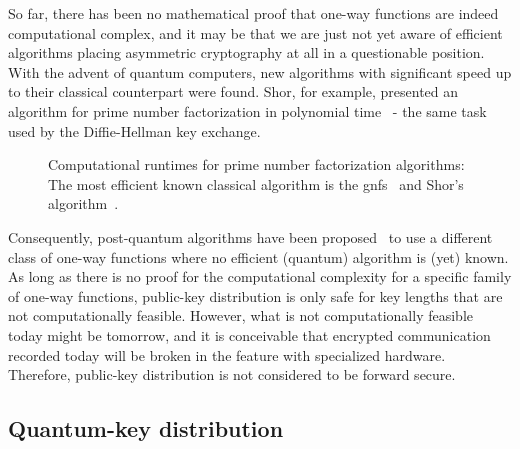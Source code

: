 So far, there has been no mathematical proof that one-way functions are indeed computational complex, and it may be that we are just not yet aware of efficient algorithms placing asymmetric cryptography at all in a questionable position.
With the advent of quantum computers, new algorithms with significant speed up to their classical counterpart were found.
Shor, for example, presented an algorithm for prime number factorization in polynomial time~\cite{Shor1994} - the same task used by the Diffie-Hellman key exchange.
\begin{figure}[htb]
	\centering
	
	\caption{Computational runtimes for prime number factorization algorithms: The most efficient known classical algorithm is the \gls{gnfs}~\cite{Lenstra1993} and Shor's algorithm~\cite{Shor1994}.}
\end{figure}
Consequently, post-quantum algorithms have been proposed~\cite{Bernstein2017,Chen2016} to use a different class of one-way functions where no efficient (quantum) algorithm is (yet) known.
As long as there is no proof for the computational complexity for a specific family of one-way functions, public-key distribution is only safe for key lengths that are not computationally feasible.
However, what is not computationally feasible today might be tomorrow, and it is conceivable that encrypted communication recorded today will be broken in the feature with specialized hardware.
Therefore, public-key distribution is not considered to be forward secure.

\FloatBarrier
\subsection{Quantum-key distribution}

